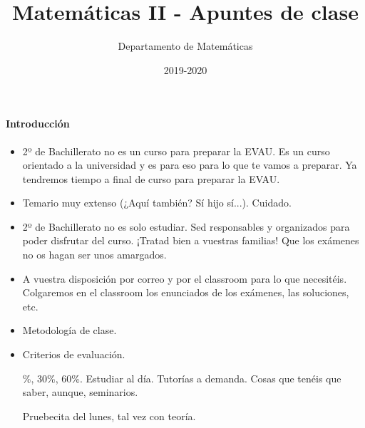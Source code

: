 \documentclass[nobuilddate]{Docencia}
\title{Matemáticas II - Apuntes de clase}
\author{Departamento de Matemáticas}
\date{2019-2020}
\begin{document}
\pagestyle{plain}
\maketitle
\tableofcontents
\newpage

\newcommand{\hide}[1]{#1}

\renewcommand{\vec}[1]{\overrightarrow{#1}}

\paragraph{Introducción}

\begin{itemize}
    \item 2º de Bachillerato no es un curso para preparar la EVAU. Es un curso orientado a la universidad y es para eso para lo que te vamos a preparar. 
    Ya tendremos tiempo a final de curso para preparar la EVAU.

    \item Temario muy extenso (¿Aquí también? Sí hijo sí...). Cuidado.
    
    \item 2º de Bachillerato no es solo estudiar. Sed responsables y organizados para poder disfrutar del curso. ¡Tratad bien a vuestras familias! Que los exámenes no os hagan ser unos amargados.
    
    \item A vuestra disposición por correo y por el classroom para lo que necesitéis. Colgaremos en el classroom los enunciados de los exámenes, las soluciones, etc.

    \item Metodología de clase.
    
    \item Criterios de evaluación.

    \%, 30\%, 60\%. Estudiar al día. Tutorías a demanda. Cosas que tenéis que saber, aunque, seminarios.

    \subitem Pruebecita del lunes, tal vez con teoría.

\end{itemize}







\newpage
\printindex
\listoffigures
\listoftables
\end{document}
